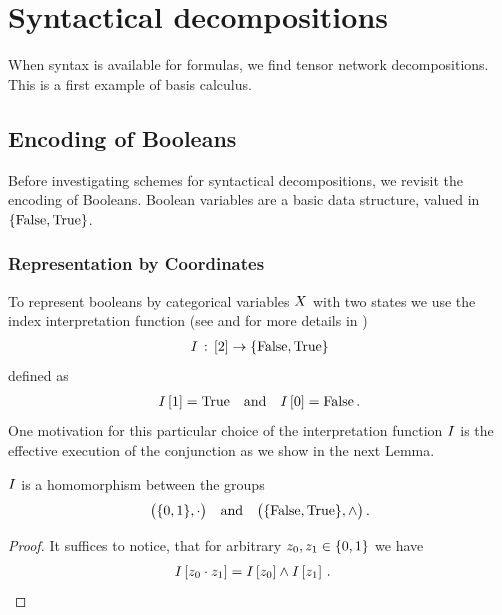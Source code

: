 \section{Syntactical decompositions}

When syntax is available for formulas, we find tensor network decompositions.
This is a first example of basis calculus.

\subsection{Encoding of Booleans}\label{sec:booleanEncoding}

Before investigating schemes for syntactical decompositions, we revisit the encoding of Booleans.
Boolean variables are a basic data structure, valued in $\{\mathrm{False},\mathrm{True}\}$.

\subsubsection{Representation by Coordinates}

To represent booleans by categorical variables $X$ with two states we use the index interpretation function (see  and for more details  in )
\begin{align*}
    I \,:\, [2]\rightarrow\{\mathrm{False},\mathrm{True}\}
\end{align*}
defined as
\begin{align*}
    I\left[1\right] = \mathrm{True}
    \quad\text{and}\quad I\left[0\right] = \mathrm{False} \, .
\end{align*}
One motivation for this particular choice of the interpretation function $I$ is the effective execution of the conjunction as we show in the next Lemma.

\begin{lemma}
    $I$ is a homomorphism between the groups
    \begin{align*}
        \big(\{0,1\},\cdot\big)  \quad\text{and}\quad \big(\{\mathrm{False},\mathrm{True}\},\land\big) \, .
    \end{align*}
\end{lemma}
\begin{proof}
    It suffices to notice, that for arbitrary $z_{0},z_{1}\in\{0,1\}$ we have
    \begin{align*}
        I\left[z_{0} \cdot z_{1}\right]
        = I\left[z_{0}\right] \land I\left[z_{1}\right]  \, . & \qedhere
    \end{align*}
\end{proof}

